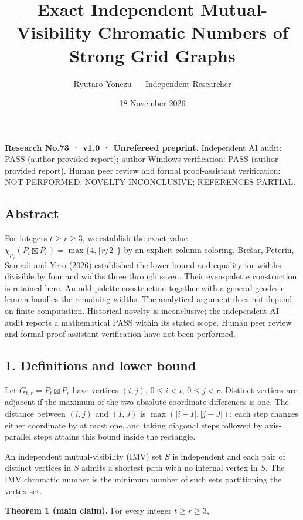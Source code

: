 \documentclass[
  11pt,
]{article}
\title{Exact Independent Mutual-Visibility Chromatic Numbers of Strong
Grid Graphs}
\author{Ryutaro Yonezu --- Independent Researcher}
\date{18 November 2026}
\begin{document}
\maketitle

\textbf{Research No.73 · v1.0 · Unrefereed preprint.} Independent AI
audit: PASS (author-provided report); author Windows verification: PASS
(author-provided report). Human peer review and formal proof-assistant
verification: NOT PERFORMED. NOVELTY INCONCLUSIVE; REFERENCES PARTIAL.

\subsection{Abstract}\label{abstract}

For integers \(t\ge r\ge3\), we establish the exact value
\(\chi_{\mu_i}(P_t\boxtimes P_r)=\max\{4,\lceil r/2\rceil\}\) by an
explicit column coloring. Brešar, Peterin, Samadi and Yero (2026)
established the lower bound and equality for widths divisible by four
and widths three through seven. Their even-palette construction is
retained here. An odd-palette construction together with a general
geodesic lemma handles the remaining widths. The analytical argument
does not depend on finite computation. Historical novelty is
inconclusive; the independent AI audit reports a mathematical PASS
within its stated scope. Human peer review and formal proof-assistant
verification have not been performed.

\subsection{1. Definitions and lower
bound}\label{definitions-and-lower-bound}

Let \(G_{t,r}=P_t\boxtimes P_r\) have vertices \((i,j)\), \(0\le i<t\),
\(0\le j<r\). Distinct vertices are adjacent if the maximum of the two
absolute coordinate differences is one. The distance between \((i,j)\)
and \((I,J)\) is \(\max(|i-I|,|j-J|)\): each step changes either
coordinate by at most one, and taking diagonal steps followed by
axis-parallel steps attains this bound inside the rectangle.

An independent mutual-visibility (IMV) set \(S\) is independent and each
pair of distinct vertices in \(S\) admits a shortest path with no
internal vertex in \(S\). The IMV chromatic number is the minimum number
of such sets partitioning the vertex set.

\textbf{Theorem 1 (main claim).} For every integer \(t\ge r\ge3\),
\end{document}
